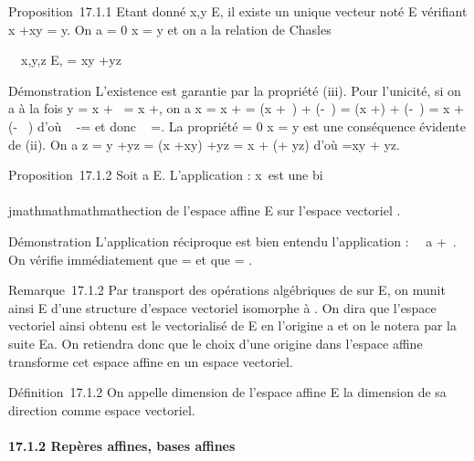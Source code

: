 Proposition~17.1.1 Etant donné x,y \in E, il existe un unique vecteur noté
\overrightarrowxy \in\overrightarrow
E vérifiant x +\overrightarrow xy = y. On a
\overrightarrowxy = 0 \Leftrightarrow x
= y et on a la relation de Chasles

\forall~~x,y,z \in E,
\overrightarrowxz =\overrightarrow
xy +\overrightarrow yz

Démonstration L'existence est garantie par la propriété (iii). Pour
l'unicité, si on a à la fois y = x +\overrightarrow \xi~
= x +\overrightarrow \eta, on a x = x
+ = (x
+\overrightarrow \xi~) +
(-\overrightarrow\xi~) = (x
+\overrightarrow \eta) +
(-\overrightarrow\xi~) = x +
(\overrightarrow\eta -\overrightarrow
\xi~) d'où \overrightarrow\xi~
-\overrightarrow \eta = et donc \overrightarrow\xi~
=\overrightarrow \eta. La propriété
\overrightarrowxy = 0 \Leftrightarrow x
= y est une conséquence évidente de (ii). On a z = y
+\overrightarrow yz = (x
+\overrightarrow xy)
+\overrightarrow yz = x +
(\overrightarrowxy +\overrightarrow
yz) d'où \overrightarrowxz
=\overrightarrow xy +\overrightarrow
yz.

Proposition~17.1.2 Soit a \in E. L'application \phia :
x\mapsto~\overrightarrowax est
une bi\\\\jmathmathmathmathection de l'espace affine E sur l'espace vectoriel
\overrightarrowE.

Démonstration L'application réciproque est bien entendu l'application
\psia :\overrightarrow
\xi~\mapsto~a +\overrightarrow \xi~.
On vérifie immédiatement que \psia \cdot \phia =
\mathrmIdE et que \phia \cdot \psia
=
\mathrmId\overrightarrowE.

Remarque~17.1.2 Par transport des opérations algébriques de
\overrightarrowE sur E, on munit ainsi E d'une
structure d'espace vectoriel isomorphe à
\overrightarrowE. On dira que l'espace vectoriel
ainsi obtenu est le vectorialisé de E en l'origine a et on le notera par
la suite Ea. On retiendra donc que le choix d'une origine dans
l'espace affine transforme cet espace affine en un espace vectoriel.

Définition~17.1.2 On appelle dimension de l'espace affine E la dimension
de sa direction \overrightarrowE comme espace
vectoriel.

\paragraph{17.1.2 Repères affines, bases affines}

